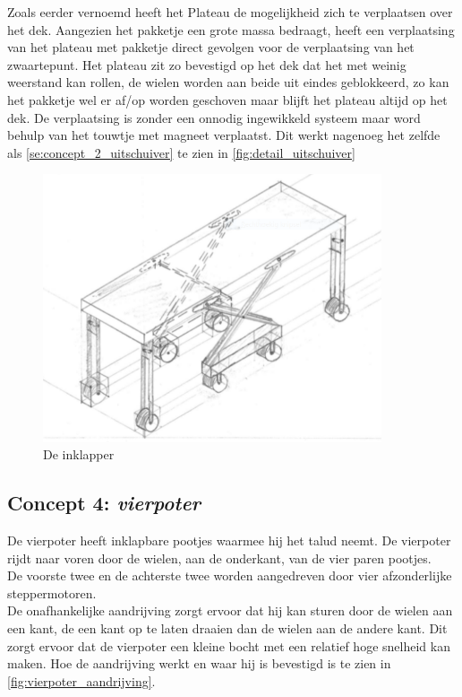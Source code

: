 Zoals eerder vernoemd heeft het Plateau de mogelijkheid zich te verplaatsen over het dek. Aangezien het pakketje een grote massa bedraagt, heeft een verplaatsing van het plateau met pakketje direct gevolgen voor de verplaatsing van het zwaartepunt. Het plateau zit zo bevestigd op het dek dat het met weinig weerstand kan rollen, de wielen worden aan beide uit eindes geblokkeerd, zo kan het pakketje wel er af/op worden geschoven maar blijft het plateau altijd op het dek. De verplaatsing is zonder een onnodig ingewikkeld systeem maar word behulp van het touwtje met magneet verplaatst. Dit werkt nagenoeg het zelfde als \cref{se:concept_2_uitschuiver} te zien in \cref{fig:detail_uitschuiver}\\

\begin{figure}[H]
    \includegraphics[width = 100mm]{Foto_inklapper.PNG}
    \caption{De inklapper}
    \label{fig:inklapper}
\end{figure}

\subsection{Concept 4: \textit{vierpoter}}
\label{se:vierpoter}
\vspace{\baselineskip}
De vierpoter heeft inklapbare pootjes waarmee hij het talud neemt. De vierpoter rijdt naar voren door de wielen, aan de onderkant, van de vier paren pootjes.\\
De voorste twee en de achterste twee worden aangedreven door vier afzonderlijke steppermotoren. \\
De onafhankelijke aandrijving zorgt ervoor dat hij kan sturen door de wielen aan een kant, de een kant op te laten draaien dan de wielen aan de andere kant. Dit zorgt ervoor dat de vierpoter een kleine bocht met een relatief hoge snelheid kan maken.  Hoe de aandrijving werkt en waar hij is bevestigd is te zien in \cref{fig:vierpoter_aandrijving}.\\

